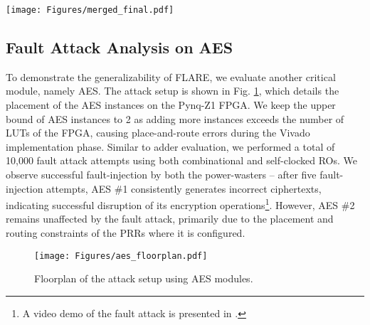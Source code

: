

 \begin{figure*}[t]

\texttt{[image: Figures/merged\_final.pdf]}

\caption{ Parts (a) and (b) depict the number of fails in adder clusters \#1 and \#2, respectively, with ROs. Parts (c) and (d) show the fail frequency in clusters \#1 and \#2, respectively, with self-clocked ROs. }
\label{addf}
\vspace{-0.4cm}
\end{figure*}


\subsection{Fault Attack Analysis on AES}
\vspace{-0.1cm}
To demonstrate the generalizability of FLARE, we evaluate another critical module, namely AES. The attack setup is shown in Fig. \ref{aesfloorplan}, which details the placement of the AES instances on the Pynq-Z1 FPGA. We keep the upper bound of AES instances to 2 as adding more instances exceeds the number of LUTs of the FPGA, causing place-and-route errors during the Vivado implementation phase. Similar to adder evaluation, we performed a total of 10,000 fault attack attempts using both combinational and self-clocked ROs. We observe successful fault-injection by both the power-wasters --  after five fault-injection attempts, AES \#1 consistently generates incorrect ciphertexts, indicating successful disruption of its encryption operations\footnote[1]{A video demo of the fault attack is presented in \cite{demo}.}. However, AES \#2 remains unaffected by the fault attack, primarily due to the placement and routing constraints of the PRRs where it is configured.

\vspace{-0.1cm}
 \begin{figure}
\centering
\texttt{[image: Figures/aes\_floorplan.pdf]}

\caption{Floorplan of the attack setup using AES modules.}
\label{aesfloorplan}
\vspace{-0.1cm}
\end{figure}
